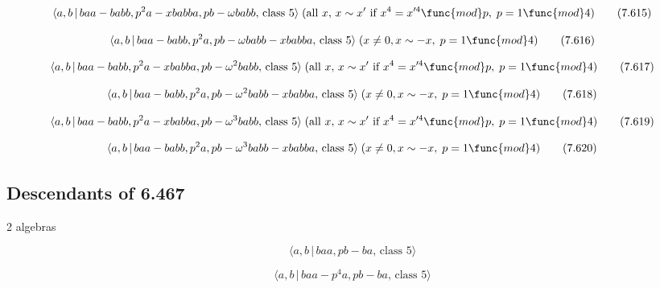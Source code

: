 \documentclass[10pt]{article}
\begin{document}
\begin{equation}
\langle a,b\,|\,baa-babb,p^{2}a-xbabba,pb-\omega babb,\,\text{class }%
5\rangle \;(\text{all }x,\,x\sim x^{\prime}\text{ if }x^4=x^{\prime 4}\func{%
mod}p,\;p=1\func{mod}4)  \tag{7.615}
\end{equation}

\begin{equation}
\langle a,b\,|\,baa-babb,p^{2}a,pb-\omega babb-xbabba,\,\text{class }%
5\rangle \;(x\neq 0,x\sim -x,\;p=1\func{mod}4)  \tag{7.616}
\end{equation}

\begin{equation}
\langle a,b\,|\,baa-babb,p^{2}a-xbabba,pb-\omega ^{2}babb,\,\text{class }%
5\rangle \;(\text{all }x,\,x\sim x^{\prime}\text{ if }x^4=x^{\prime 4}\func{%
mod}p,\;p=1\func{mod}4)  \tag{7.617}
\end{equation}

\begin{equation}
\langle a,b\,|\,baa-babb,p^{2}a,pb-\omega ^{2}babb-xbabba,\,\text{class }%
5\rangle \;(x\neq 0,x\sim -x,\;p=1\func{mod}4)  \tag{7.618}
\end{equation}

\begin{equation}
\langle a,b\,|\,baa-babb,p^{2}a-xbabba,pb-\omega ^{3}babb,\,\text{class }%
5\rangle \;(\text{all }x,\,x\sim x^{\prime}\text{ if }x^4=x^{\prime 4}\func{%
mod}p,\;p=1\func{mod}4)  \tag{7.619}
\end{equation}

\begin{equation}
\langle a,b\,|\,baa-babb,p^{2}a,pb-\omega ^{3}babb-xbabba,\,\text{class }%
5\rangle \;(x\neq 0,x\sim -x,\;p=1\func{mod}4)  \tag{7.620}
\end{equation}

\subsection{Descendants of 6.467}

2 algebras

\begin{equation}
\langle a,b\,|\,baa,pb-ba,\,\text{class }5\rangle  \tag{7.621}
\end{equation}

\begin{equation}
\langle a,b\,|\,baa-p^4a,pb-ba,\,\text{class }5\rangle  \tag{7.622}
\end{equation}
\end{document}
